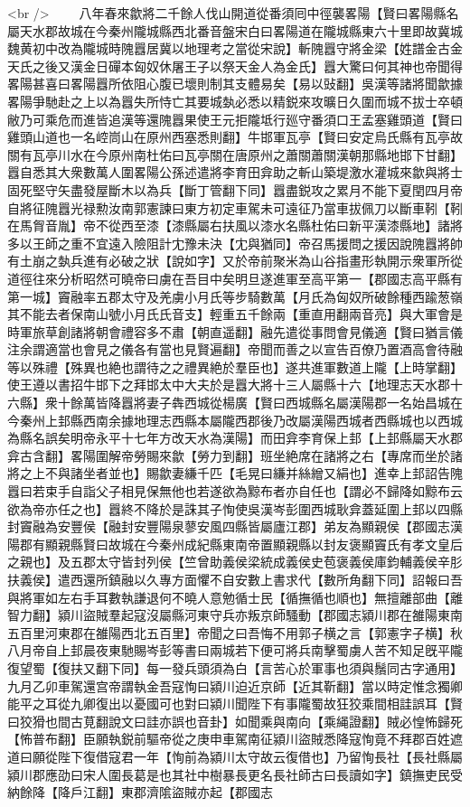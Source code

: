 <br />
　　八年春來歙將二千餘人伐山開道從番須囘中徑襲畧陽【賢曰畧陽縣名屬天水郡故城在今秦州隴城縣西北番音盤宋白曰畧陽道在隴城縣東六十里即故冀城魏黄初中改為隴城時隗囂居冀以地理考之當從宋說】斬隗囂守將金梁【姓譜金古金天氏之後又漢金日磾本匈奴休屠王子以祭天金人為金氏】囂大驚曰何其神也帝聞得畧陽甚喜曰畧陽囂所依阻心腹已壞則制其支體易矣【易以䜴翻】吳漢等諸將聞歙據畧陽爭馳赴之上以為囂失所恃亡其要城埶必悉以精鋭來攻曠日久圍而城不拔士卒頓敝乃可乘危而進皆追漢等還隗囂果使王元拒隴坻行廵守番須口王孟塞雞頭道【賢曰雞頭山道也一名崆峝山在原州西塞悉則翻】牛邯軍瓦亭【賢曰安定烏氏縣有瓦亭故關有瓦亭川水在今原州南杜佑曰瓦亭關在唐原州之蕭關蕭關漢朝那縣地邯下甘翻】囂自悉其大衆數萬人圍畧陽公孫述遣將李育田弇助之斬山築堤激水灌城來歙與將士固死堅守矢盡發屋斷木以為兵【斷丁管翻下同】囂盡鋭攻之累月不能下夏閏四月帝自將征隗囂光禄勲汝南郭憲諫曰東方初定車駕未可遠征乃當車拔佩刀以斷車靷【靷在馬胷音胤】帝不從西至漆【漆縣屬右扶風以漆水名縣杜佑曰新平漢漆縣地】諸將多以王師之重不宜遠入險阻計冘豫未決【冘與猶同】帝召馬援問之援因說隗囂將帥有土崩之埶兵進有必破之狀【說如字】又於帝前聚米為山谷指畫形執開示衆軍所從道徑往來分析昭然可曉帝曰虜在吾目中矣明旦遂進軍至高平第一【郡國志高平縣有第一城】竇融率五郡太守及羌虜小月氏等步騎數萬【月氏為匈奴所破餘種西踰葱嶺其不能去者保南山號小月氏氏音支】輕重五千餘兩【重直用翻兩音亮】與大軍會是時軍旅草創諸將朝會禮容多不肅【朝直遥翻】融先遣從事問會見儀適【賢曰猶言儀注余謂適當也會見之儀各有當也見賢遍翻】帝聞而善之以宣告百僚乃置酒高會待融等以殊禮【殊異也絶也謂待之之禮異絶於羣臣也】遂共進軍數道上隴【上時掌翻】使王遵以書招牛邯下之拜邯太中大夫於是囂大將十三人屬縣十六【地理志天水郡十六縣】衆十餘萬皆降囂將妻子犇西城從楊廣【賢曰西城縣名屬漢陽郡一名始昌城在今秦州上邽縣西南余據地理志西縣本屬隴西郡後乃改屬漢陽西城者西縣城也以西城為縣名誤矣明帝永平十七年方改天水為漢陽】而田弇李育保上邽【上邽縣屬天水郡弇古含翻】畧陽圍解帝勞賜來歙【勞力到翻】班坐絶席在諸將之右【專席而坐於諸將之上不與諸坐者並也】賜歙妻縑千匹【毛晃曰縑并絲繒又絹也】進幸上邽詔告隗囂曰若束手自詣父子相見保無他也若遂欲為黥布者亦自任也【謂必不歸降如黥布云欲為帝亦任之也】囂終不降於是誅其子恂使吳漢岑彭圍西城耿弇蓋延圍上邽以四縣封竇融為安豐侯【融封安豐陽泉蓼安風四縣皆屬廬江郡】弟友為顯親侯【郡國志漢陽郡有顯親縣賢曰故城在今秦州成紀縣東南帝置顯親縣以封友褒顯竇氏有孝文皇后之親也】及五郡太守皆封列侯【竺曾助義侯梁統成義侯史苞褒義侯庫鈞輔義侯辛肜扶義侯】遣西還所鎮融以久專方面懼不自安數上書求代【數所角翻下同】詔報曰吾與將軍如左右手耳數執謙退何不曉人意勉循士民【循撫循也順也】無擅離部曲【離智力翻】潁川盜賊羣起寇沒屬縣河東守兵亦叛京師騷動【郡國志潁川郡在雒陽東南五百里河東郡在雒陽西北五百里】帝聞之曰吾悔不用郭子横之言【郭憲字子横】秋八月帝自上邽晨夜東馳賜岑彭等書曰兩城若下便可將兵南擊蜀虜人苦不知足旣平隴復望蜀【復扶又翻下同】每一發兵頭須為白【言苦心於軍事也須與鬚同古字通用】九月乙卯車駕還宫帝謂執金吾寇恂曰潁川迫近京師【近其靳翻】當以時定惟念獨卿能平之耳從九卿復出以憂國可也對曰潁川聞陛下有事隴蜀故狂狡乘間相詿誤耳【賢曰狡猾也間古莧翻說文曰詿亦誤也音卦】如聞乘與南向【乘䋲證翻】賊必惶怖歸死【怖普布翻】臣願執鋭前驅帝從之庚申車駕南征潁川盜賊悉降寇恂竟不拜郡百姓遮道曰願從陛下復借寇君一年【恂前為潁川太守故云復借也】乃留恂長社【長社縣屬潁川郡應劭曰宋人圍長葛是也其社中樹暴長更名長社師古曰長讀如字】鎮撫吏民受納餘降【降戶江翻】東郡濟隂盜賊亦起【郡國志